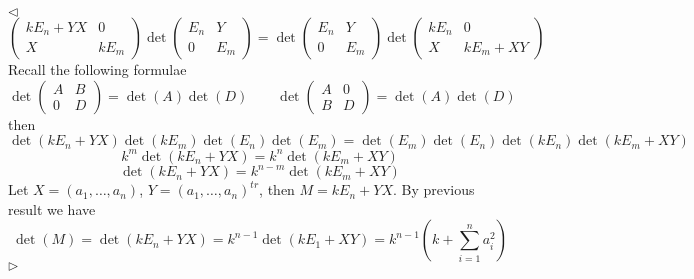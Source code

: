 \documentclass[12pt]{article}
\newenvironment{solution}{\par $\triangleleft$}{$\triangleright$}
\begin{document}
\begin{solution}
$$\begin{pmatrix}
            kE_n + YX & 0    \\
            X         & kE_m
        \end{pmatrix}
        \det\begin{pmatrix}
            E_n & Y \\ 0 & E_m
        \end{pmatrix}
        =
        \det\begin{pmatrix}
            E_n & Y   \\
            0   & E_m
        \end{pmatrix}
        \det\begin{pmatrix}
            kE_n & 0       \\
            X    & kE_m+XY
        \end{pmatrix}
    $$
    Recall the following formulae
    $$
        \det\begin{pmatrix} A&B\\0&D\end{pmatrix}=\det(A)\det(D)\qquad
        \det\begin{pmatrix} A&0\\B&D\end{pmatrix}=\det(A)\det(D)\qquad
    $$
    then
    $$
        \det(kE_n+YX)\det(kE_m)\det(E_n)\det(E_m)
        =
        \det(E_m)\det(E_n)\det(kE_n)\det(kE_m+XY)
    $$
    $$
        k^m\det(kE_n+YX)=k^{n}\det(kE_m+XY)
    $$
    $$
        \det(kE_n+YX)=k^{n-m}\det(kE_m+XY)
    $$
    Let $X=(a_1,\ldots,a_n)$, $Y={(a_1,\ldots,a_n)}^{tr}$, then $M=k E_n+YX$. By
    previous result we have
    $$
        \det(M)=\det(kE_n+YX)=k^{n-1}\det(kE_1+XY)
        =k^{n-1}\left(k+\sum_{i=1}^n a_i^2\right)
    $$
\end{solution}
\end{document}

